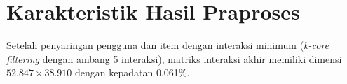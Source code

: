 \section{Karakteristik Hasil Praproses}
Setelah penyaringan pengguna dan item dengan interaksi minimum (\emph{k-core
filtering} dengan ambang 5 interaksi), matriks interaksi akhir memiliki
dimensi $52.847 \times 38.910$ dengan kepadatan 0,061\%.
